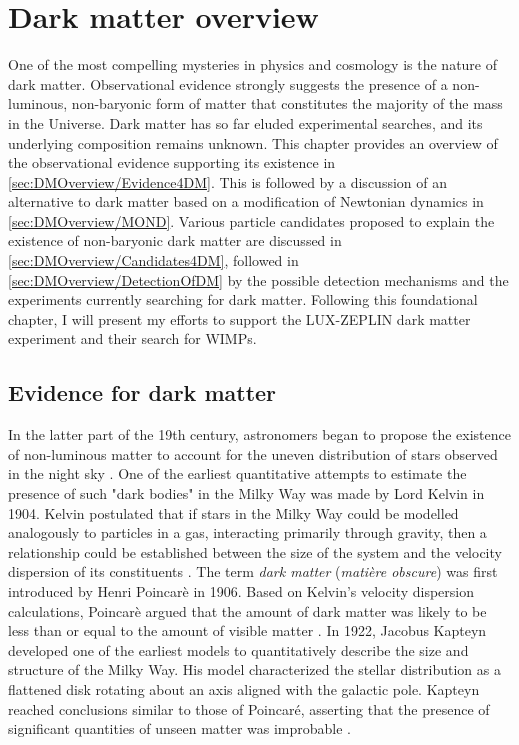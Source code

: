 \chapter{Dark matter overview}\label{chap:DarkMatterOverview}
One of the most compelling mysteries in physics and cosmology is the nature of dark matter. Observational evidence strongly suggests the presence of a non-luminous, non-baryonic form of matter that constitutes the majority of the mass in the Universe. Dark matter has so far eluded experimental searches, and its underlying composition remains unknown.
This chapter provides an overview of the observational evidence supporting its existence in \autoref{sec:DMOverview/Evidence4DM}. This is followed by a discussion of an alternative to dark matter based on a modification of Newtonian dynamics in \autoref{sec:DMOverview/MOND}. Various particle candidates proposed to explain the existence of non-baryonic dark matter are discussed in \autoref{sec:DMOverview/Candidates4DM}, followed in \autoref{sec:DMOverview/DetectionOfDM} by the possible detection mechanisms and the experiments currently searching for dark matter. Following this foundational chapter, I will present my efforts to support the LUX-ZEPLIN dark matter experiment and their search for WIMPs.

\section{Evidence for dark matter}\label{sec:DMOverview/Evidence4DM}
In the latter part of the 19th century, astronomers began to propose the existence of non-luminous matter to account for the uneven distribution of stars observed in the night sky \cite{HistoryofDM}. One of the earliest quantitative attempts to estimate the presence of such "dark bodies" in the Milky Way was made by Lord Kelvin in 1904. Kelvin postulated that if stars in the Milky Way could be modelled analogously to particles in a gas, interacting primarily through gravity, then a relationship could be established between the size of the system and the velocity dispersion of its constituents \cite{Kelvin1904}. The term \textit{dark matter} (\textit{mati\`ere obscure}) was first introduced by Henri Poincar\`e in 1906. Based on Kelvin’s velocity dispersion calculations, Poincar\`e argued that the amount of dark matter was likely to be less than or equal to the amount of visible matter \cite{HPon}. In 1922, Jacobus Kapteyn developed one of the earliest models to quantitatively describe the size and structure of the Milky Way. His model characterized the stellar distribution as a flattened disk rotating about an axis aligned with the galactic pole. Kapteyn reached conclusions similar to those of Poincaré, asserting that the presence of significant quantities of unseen matter was improbable \cite{Kapteyn1922}.

